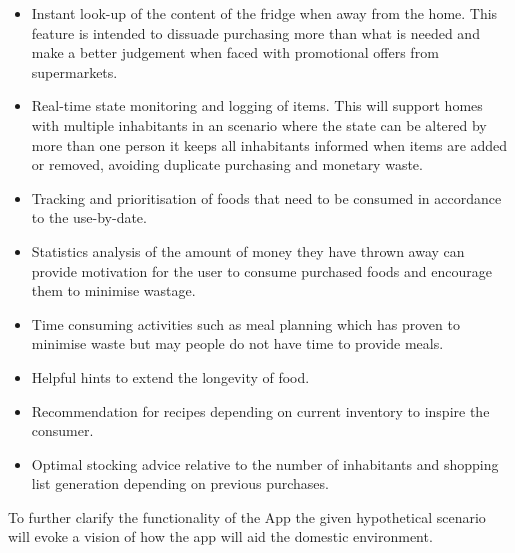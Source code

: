 \documentclass[a4paper, 11pt]{article}
\begin{document}
{\vspace{\baselineskip}

\begin{itemize}
  \item Instant look-up of the content of the fridge when away from the home. This feature is intended to dissuade purchasing more than what is needed and make a better judgement when faced with promotional offers from supermarkets.
  \item Real-time state monitoring and logging of items. This will support homes with multiple inhabitants in an scenario where the state can be altered by more than one person it keeps all inhabitants informed when items are added or removed, avoiding duplicate purchasing and monetary waste.
  \item Tracking and prioritisation of foods that need to be consumed in accordance to the use-by-date. 
   \item Statistics analysis of the amount of money they have thrown away can provide motivation for the user to consume purchased foods and encourage them to minimise wastage.
    \item Time consuming activities such as meal planning which has proven to minimise waste but may people do not have time to provide meals. 
     \item Helpful hints to extend the longevity of food. 
\item Recommendation for recipes depending on current inventory to inspire the consumer.
\item Optimal stocking advice relative to the number of inhabitants and shopping list generation depending on previous purchases. 
 \end{itemize}

To further clarify the functionality of the App the given hypothetical scenario will evoke a vision of how the app will aid the domestic environment. 

}
\end{document}
